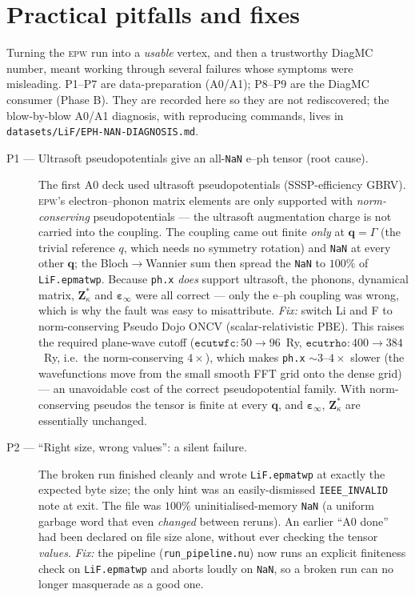\documentclass[11pt]{article}
\newcommand{\qv}{\mathbf{q}}
\newcommand{\Zst}{\mathbf{Z}^{*}}
\newcommand{\epsinf}{\bm{\varepsilon}_{\infty}}
\begin{document}
\section{Practical pitfalls and fixes}
\label{sec:pitfalls}

Turning the \textsc{epw} run into a \emph{usable} vertex, and then a trustworthy DiagMC
number, meant working through several failures whose symptoms were misleading. P1--P7 are
data-preparation (A0/A1); P8--P9 are the DiagMC consumer (Phase B). They are recorded here so
they are not rediscovered; the blow-by-blow A0/A1 diagnosis, with reproducing commands, lives
in \texttt{datasets/LiF/EPH-NAN-DIAGNOSIS.md}.

\begin{description}
  \item[P1 --- Ultrasoft pseudopotentials give an all-\texttt{NaN} e--ph tensor (root
    cause).]
    The first A0 deck used ultrasoft pseudopotentials (SSSP-efficiency GBRV). \textsc{epw}'s
    electron--phonon matrix elements are only supported with \emph{norm-conserving}
    pseudopotentials --- the ultrasoft augmentation charge is not carried into the coupling.
    The coupling came out finite \emph{only} at $\qv=\Gamma$ (the trivial reference $q$,
    which needs no symmetry rotation) and \texttt{NaN} at every other $\qv$; the
    Bloch$\to$Wannier sum then spread the \texttt{NaN} to $100\%$ of \texttt{LiF.epmatwp}.
    Because \texttt{ph.x} \emph{does} support ultrasoft, the phonons, dynamical matrix,
    $\Zst_{\kappa}$ and $\epsinf$ were all correct --- only the e--ph coupling was wrong,
    which is why the fault was easy to misattribute.
    \emph{Fix:} switch Li and F to norm-conserving Pseudo Dojo ONCV (scalar-relativistic
    PBE). This raises the required plane-wave cutoff
    ($\texttt{ecutwfc}:50\!\to\!96$~Ry, $\texttt{ecutrho}:400\!\to\!384$~Ry, i.e.\ the
    norm-conserving $4\times$), which makes \texttt{ph.x} $\sim\!3\text{--}4\times$ slower
    (the wavefunctions move from the small smooth FFT grid onto the dense grid) --- an
    unavoidable cost of the correct pseudopotential family. With norm-conserving pseudos the
    tensor is finite at every $\qv$, and $\epsinf$, $\Zst_{\kappa}$ are essentially unchanged.

  \item[P2 --- ``Right size, wrong values'': a silent failure.]
    The broken run finished cleanly and wrote \texttt{LiF.epmatwp} at exactly the expected
    byte size; the only hint was an easily-dismissed \texttt{IEEE\_INVALID} note at exit. The
    file was $100\%$ uninitialised-memory \texttt{NaN} (a uniform garbage word that even
    \emph{changed} between reruns). An earlier ``A0 done'' had been declared on file size
    alone, without ever checking the tensor \emph{values}.
    \emph{Fix:} the pipeline (\texttt{run\_pipeline.nu}) now runs an explicit finiteness
    check on \texttt{LiF.epmatwp} and aborts loudly on \texttt{NaN}, so a broken run can no
    longer masquerade as a good one.


\end{description}
\end{document}
